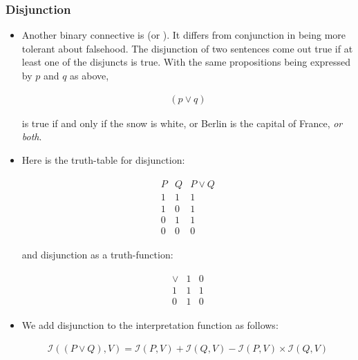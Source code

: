\documentclass[11pt]{article}
\begin{document}
\subsubsection{Disjunction}
\begin{itemize}

\item Another binary connective is  (or
).
It differs from conjunction in being more tolerant about falsehood. The
disjunction of two sentences come out true if at least one of the disjuncts is
true. With the same propositions being expressed by $p$ and $q$ as above,

\begin{align}
(p \lor q)
\end{align}

is true if and only if the snow is white, or Berlin is the capital of France,
\emph{or both}.



\item Here is the truth-table for disjunction:

\begin{align}
\begin{array}{c|c|c}
P & Q & P \lor Q \\ \hline
1 & 1 & 1\\
1 & 0 & 1\\
0 & 1 & 1\\
0 & 0 & 0
\end{array}
\end{align}

and disjunction as a truth-function:

\begin{align}
\begin{array}{c|cc}
\lor & 1 & 0 \\ \hline
1 &1 &1 \\
0 &1 &0  
\end{array}
\end{align}

\item We add disjunction to the interpretation function as follows:

\begin{align}
\mathcal{I}((P\lor Q),V) = \mathcal{I}(P,V) + \mathcal{I}(Q,V) -
\mathcal{I}(P,V) \times \mathcal{I}(Q,V)
\end{align}


\end{itemize}
\end{document}
